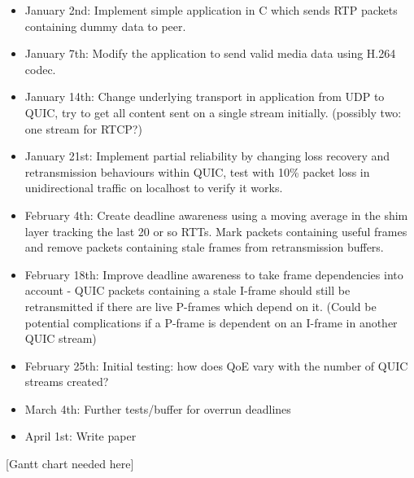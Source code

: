 \documentclass{mprop}
\begin{document}
\begin{itemize}
  \item January 2nd: Implement simple application in C which sends RTP packets containing dummy 
  data to peer.
  \item January 7th: Modify the application to send valid media data using H.264 codec.
  \item January 14th: Change underlying transport in application from UDP to QUIC, try to get all 
  content sent on a single stream initially. (possibly two: one stream for RTCP?)
  \item January 21st: Implement partial reliability by changing loss recovery and retransmission 
  behaviours within QUIC, test with 10\% packet loss in unidirectional traffic on localhost to 
  verify it works.
  \item February 4th: Create deadline awareness using a moving average in the shim layer tracking 
  the last 20 or so RTTs. Mark packets containing useful frames and remove packets containing 
  stale frames from retransmission buffers.
  \item February 18th: Improve deadline awareness to take frame dependencies into account - QUIC 
  packets containing a stale I-frame should still be retransmitted if there are live P-frames 
  which depend on it. (Could be potential complications if a P-frame is dependent on an I-frame 
  in another QUIC stream)
  \item February 25th: Initial testing: how does QoE vary with the number of QUIC streams created?
  \item March 4th: Further tests/buffer for overrun deadlines
  \item April 1st: Write paper
\end{itemize}

[Gantt chart needed here]

\newpage



\end{document}
